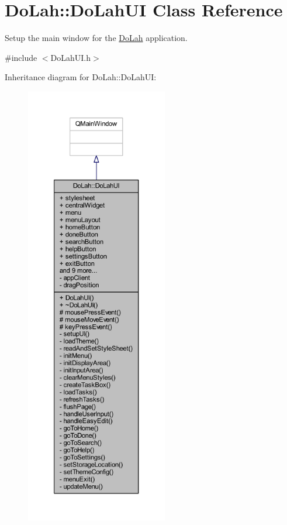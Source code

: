 \hypertarget{class_do_lah_1_1_do_lah_u_i}{}\section{Do\+Lah\+:\+:Do\+Lah\+U\+I Class Reference}
\label{class_do_lah_1_1_do_lah_u_i}


Setup the main window for the \hyperlink{namespace_do_lah}{Do\+Lah} application.  




{\ttfamily \#include $<$Do\+Lah\+U\+I.\+h$>$}



Inheritance diagram for Do\+Lah\+:\+:Do\+Lah\+U\+I\+:
\nopagebreak
\begin{figure}[H]
\begin{center}
\leavevmode
\includegraphics[height=550pt]{class_do_lah_1_1_do_lah_u_i__inherit__graph}
\end{center}
\end{figure}


